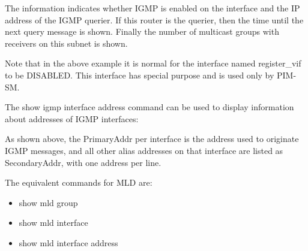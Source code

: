 \vspace{0.1in}
\noindent{}
\vspace{0.1in}

The information indicates whether IGMP is enabled on the
interface and the IP address of the IGMP querier.  If this router is
the querier, then the time until the next query message is shown.
Finally the number of multicast groups with receivers on this subnet
is shown.

Note that in the above example it is normal for the interface named
{\stt register\_vif} to be {\stt DISABLED}. This interface has special
purpose and is used only by PIM-SM.

\vspace{0.1in}
The {\stt show igmp interface address} command can be used to display
information about addresses of IGMP interfaces:

\vspace{0.1in}
\noindent{}
\vspace{0.1in}

As shown above, the {\stt PrimaryAddr} per interface is the address
used to originate IGMP messages, and all other alias addresses on that
interface are listed as {\stt SecondaryAddr}, with one address per
line.

The equivalent commands for MLD are:
\begin{itemize}
\item {\stt show mld group}
\item {\stt show mld interface}
\item {\stt show mld interface address}
\end{itemize}
